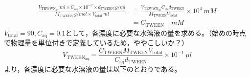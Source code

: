 \documentclass{ltjsarticle}
\begin{document}
\begin{equation}
  \begin{split}
    \frac{V_{\mathrm{TEWWN_{aq}}} \ \si{ml} \times C_{\mathrm{aq}} \times 10^{-2} \times d_{\mathrm{TWEEN}} \ \si{g/ml}}{M_{\mathrm{TWEEN}} \ \si{g/mol} \times V_{\mathrm{total}} \ \si{ml} } & = \frac{V_{\mathrm{TEWWN_{aq}}}C_{\mathrm{aq}} d_{\mathrm{TWEEN}}}{M_{\mathrm{TWEEN}}V_{\mathrm{total}}}\times10^4 \ \si{mM} \\
                                                                                                                                                                                               & = C_{\mathrm{TWEEN}} \quad\si{mM}
  \end{split}
\end{equation}
$V_{\mathrm{total}}=90,C_{\mathrm{aq}}=0.1 $として，各濃度に必要な水溶液の量を求める。（{\color{red}始めの時点で物理量を単位付きで定義しているため，ややこしいか？}）
\begin{equation}
  V_{\mathrm{TWEEN_{aq}}}=\frac{C_{\mathrm{TWEEN}}M_{\mathrm{TWEEN}}V_{\mathrm{total}}}{C_{\mathrm{aq}}d_{\mathrm{TWEEN}}}\times10^{-1} \ \si{\mu l}
\end{equation}
より，各濃度に必要な水溶液の量は以下のとおりである。\\
\end{document}
